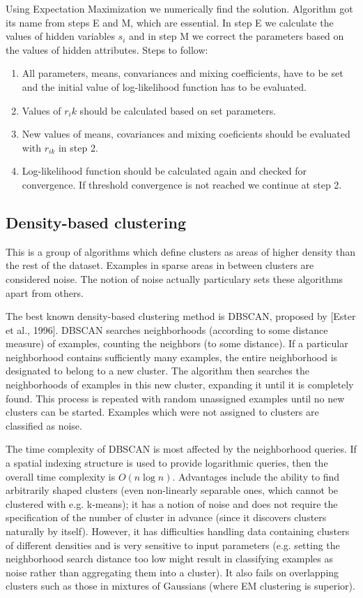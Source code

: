 \documentclass[conference]{IEEEtran}
\begin{document}
Using Expectation Maximization we numerically find the solution. Algorithm got its name from steps E and M,
which are essential. In step E we calculate the values of hidden variables $s_i$ and in step M we correct the parameters based
on the values of hidden attributes. Steps to follow:

\begin{enumerate}
	\item All parameters, means, convariances and mixing coefficients, have to be set and the initial value of log-likelihood
		function has to be evaluated.
	\item Values of $r_ik$ should be calculated based on set parameters.
	\item New values of means, covariances and mixing coeficients should be evaluated with $r_{ik}$ in step 2.
	\item Log-likelihood function should be calculated again and checked for convergence. If threshold convergence
		is not reached we continue at step 2.
\end{enumerate}


\subsection{Density-based clustering}
This is a group of algorithms which define clusters as areas of higher density than the rest
of the dataset. Examples in sparse areas in between clusters are considered noise. The notion
of noise actually particulary sets these algorithms apart from others.

The best known density-based clustering method is DBSCAN, proposed by [Ester et al., 1996].
DBSCAN searches neighborhoods (according to some distance measure) of examples,
counting the neighbors (to some distance). If a
particular neighborhood contains sufficiently many examples, the entire neighborhood is
designated to belong to a new cluster. The algorithm then searches the neighborhoods of examples
in this new cluster, expanding it until it is completely found.
This process is repeated with random unassigned examples until no new clusters can be started.
Examples which were not assigned to clusters are classified as noise.

The time complexity of DBSCAN is most affected by the neighborhood queries. If a spatial
indexing structure is used to provide logarithmic queries, then the overall time complexity
is $O(n\log n)$. Advantages include the ability to find arbitrarily shaped clusters (even
non-linearly separable ones, which cannot be clustered with e.g. k-means); it has a notion of
noise and does not require the specification of the number of cluster in advance (since it
discovers clusters naturally by itself). However, it has difficulties handling data containing
clusters of different densities and is very sensitive to input parameters (e.g. setting
the neighborhood search distance too low might result in classifying examples as noise
rather than aggregating them into a cluster). It also fails on overlapping clusters such as
those in mixtures of Gaussians (where EM clustering is superior).
\end{document}
